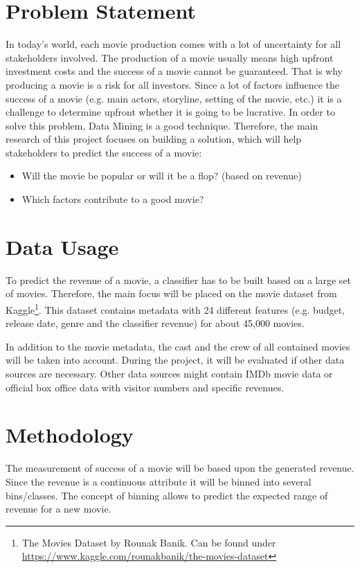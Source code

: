 

 
\section{Problem Statement}
In today's world, each movie production comes with a lot of uncertainty for all stakeholders involved. The production of a movie usually means high upfront investment costs and the success of a movie cannot be guaranteed. That is why producing a movie is a risk for all investors.
Since a lot of factors influence the success of a movie (e.g. main actors, storyline, setting of the movie, etc.) it is a challenge to determine upfront whether it is going to be lucrative.
In order to solve this problem, Data Mining is a good technique.
Therefore, the main research of this project focuses on building a solution, which will help stakeholders to predict the success of a movie:

\begin{itemize}
    \item Will the movie be popular or will it be a flop? (based on revenue)
    \item Which factors contribute to a good movie?
\end{itemize}


\section{Data Usage}
To predict the revenue of a movie, a classifier has to be built based on a large set of movies. Therefore, the main focus will be placed on the movie dataset from Kaggle\footnote{The Movies Dataset by Rounak Banik. Can be found under \url{https://www.kaggle.com/rounakbanik/the-movies-dataset}}. This dataset contains metadata with 24 different features (e.g. budget, release date, genre and the classifier revenue) for about 45,000 movies.

In addition to the movie metadata, the cast and the crew of all contained movies will be taken into account. During the project, it will be evaluated if other data sources are necessary. Other data sources might contain IMDb movie data or official box office data with visitor numbers and specific revenues.


\section{Methodology}

The measurement of success of a movie will be based upon the generated revenue. Since the revenue is a continuous attribute it will be binned into several bins/classes. The concept of binning allows to predict the expected range of revenue for a new movie.

